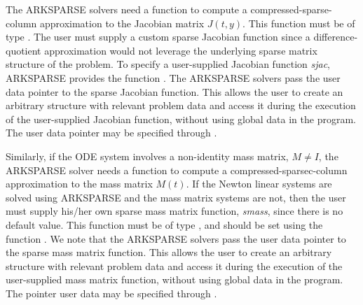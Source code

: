 \documentclass[letterpaper,10pt,english]{sphinxmanual}
\begin{document}
The ARKSPARSE solvers need a function to compute a
compressed-sparse-column approximation to the Jacobian matrix
$J(t,y)$. This function must be of type
{\hyperref[c_interface/User_supplied:ARKSlsSparseJacFn]{}}.  The user must supply a custom sparse
Jacobian function since a difference-quotient approximation would not
leverage the underlying sparse matrix structure of the problem.  To
specify a user-supplied Jacobian function \emph{sjac}, ARKSPARSE provides
the function {\hyperref[c_interface/User_callable:ARKSlsSetSparseJacFn]{}}. The ARKSPARSE solvers
pass the user data pointer to the sparse Jacobian function.  This
allows the user to create an arbitrary structure with relevant problem
data and access it during the execution of the user-supplied Jacobian
function, without using global data in the program. The user
data pointer may be specified through {\hyperref[c_interface/User_callable:ARKodeSetUserData]{}}.

Similarly, if the ODE system involves a non-identity mass matrix,
$M\ne I$, the ARKSPARSE solver needs a function to compute a
compressed-sparsec-column approximation to the mass matrix
$M(t)$.  If the Newton linear systems are solved using ARKSPARSE
and the mass matrix systems are not, then the user must supply his/her
own sparse mass matrix function, \emph{smass}, since there is no default
value.  This function must be of type {\hyperref[c_interface/User_supplied:ARKSlsSparseMassFn]{}},
and should be set using the function
{\hyperref[c_interface/User_callable:ARKSlsSetSparseMassFn]{}}.  We note that the ARKSPARSE solvers
pass the user data pointer to the sparse mass matrix function. This
allows the user to create an arbitrary structure with relevant problem
data and access it during the execution of the user-supplied mass
matrix function, without using global data in the program. The pointer
user data may be specified through {\hyperref[c_interface/User_callable:ARKodeSetUserData]{}}.
\end{document}
